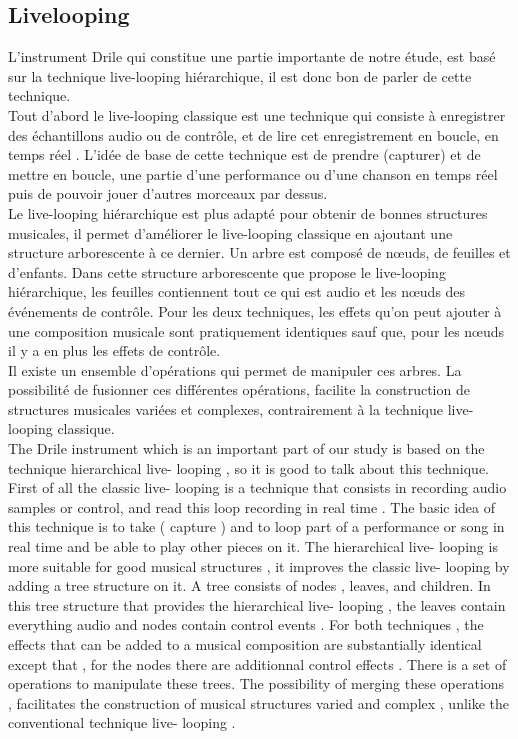 \subsection{Livelooping}
L'instrument Drile qui constitue une partie importante de notre étude, est basé sur la technique live-looping hiérarchique, il est donc bon de parler de cette technique.\\
Tout d'abord le live-looping classique est une technique qui consiste à enregistrer des échantillons audio ou de contrôle, et de lire cet enregistrement en boucle, en temps réel . L'idée de base de cette technique est de prendre (capturer) et de mettre en boucle, une partie d'une performance ou d'une chanson en temps réel puis de pouvoir jouer d'autres morceaux par dessus. \\
Le live-looping hiérarchique est plus adapté pour obtenir de bonnes structures musicales, il permet d'améliorer le live-looping classique en ajoutant une structure arborescente à ce dernier. Un arbre est composé de nœuds, de feuilles et d’enfants. Dans cette structure arborescente que propose le live-looping hiérarchique, les feuilles contiennent tout ce qui est audio et les nœuds des événements de contrôle. Pour les deux techniques, les effets qu'on peut ajouter à une composition musicale sont pratiquement identiques sauf que, pour les nœuds il y a en plus les effets de contrôle.\\
Il existe un ensemble d'opérations qui permet de manipuler ces arbres. La possibilité de fusionner ces différentes opérations, facilite la construction de structures musicales variées et complexes, contrairement à la technique live-looping classique.\\

The Drile instrument which is an important part of our study is based on the technique hierarchical live- looping , so it is good to talk about this technique. First of all the classic live- looping is a technique that consists in recording audio samples or control, and read this loop recording in real time . The basic idea of this technique is to take ( capture ) and to loop part of a performance or song in real time and be able to play other pieces on it. The hierarchical live- looping is more suitable for good musical structures , it improves the classic live- looping by adding a tree structure on it. A tree consists of nodes , leaves, and children. In this tree structure that provides the hierarchical live- looping , the leaves contain everything audio and nodes contain control events . For both techniques , the effects that can be added to a musical composition are substantially identical except that , for the nodes there are additionnal control effects . There is a set of operations to manipulate these trees. The possibility of merging these operations , facilitates the construction of musical structures varied and complex , unlike the conventional technique live- looping .